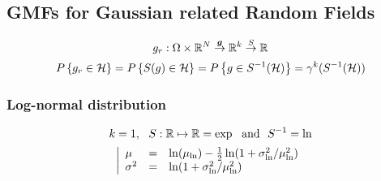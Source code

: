 \documentclass[12pt]{article}
\begin{document}
\subsection{GMFs for Gaussian related Random Fields}
\begin{equation}
  g_r : \Omega\times\mathbb{R}^N \overset{\boldsymbol{g}}{\rightarrow} \mathbb{R}^k \overset{S}{\rightarrow} \mathbb{R}
\end{equation}
\begin{equation}
    P\left\{g_r\in\mathcal{H}\right\} = P\left\{S(g)\in\mathcal{H}\right\} = P\left\{g\in S^{-1}(\mathcal{H})\right\} = \gamma^k(S^{-1}(\mathcal{H}))
\end{equation}

\subsubsection{Log-normal distribution}
\begin{equation}
  k=1, \ \ \rfunc:\RR\mapsto\RR=\exp \ \ \text{and} \ \ \irfunc=\ln
\end{equation}
\begin{equation}
  \left|
  \begin{array}{lcl}
    \mu & = &\ln(\mu_{\ln}) - \frac{1}{2}\ln(1+\sigma_{\ln}^2/\mu_{\ln}^2) \\
    \sigma^2 & = & \ln(1+\sigma_{\ln}^2/\mu_{\ln}^2)
  \end{array}
  \right.
\end{equation}
\end{document}
